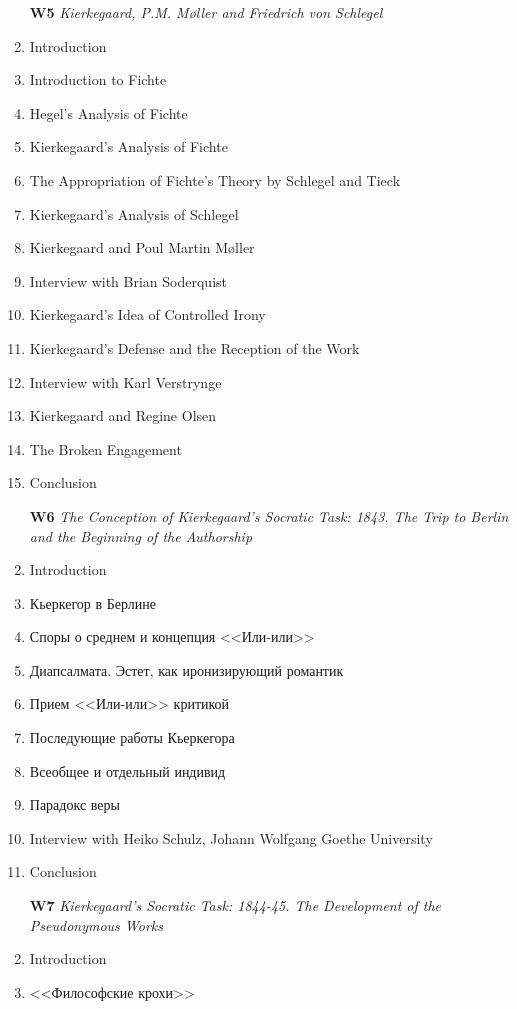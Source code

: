 \documentclass[a4paper]{article}
\begin{document}
\begin{multicols}{2}
\begin{enumerate}
\item[\bf W5] \textsl{Kierkegaard, P.M. Møller and Friedrich von Schlegel}
\item  Introduction
\item  Introduction to Fichte
\item  Hegel’s Analysis of Fichte
\item  Kierkegaard’s Analysis of Fichte
\item  The Appropriation of Fichte’s Theory by Schlegel and Tieck
\item  Kierkegaard’s Analysis of Schlegel
\item  Kierkegaard and Poul Martin Møller
\item  Interview with Brian Soderquist
\item  Kierkegaard’s Idea of Controlled Irony
\item  Kierkegaard’s Defense and the Reception of the Work
\item  Interview with Karl Verstrynge
\item  Kierkegaard and Regine Olsen
\item  The Broken Engagement
\item  Conclusion
\end{enumerate}

\begin{enumerate}
\item[\bf W6] \textsl{The Conception of Kierkegaard’s Socratic Task: 1843. The Trip to Berlin and the Beginning of the Authorship}
\item Introduction
\item Кьеркегор в Берлине
\item Споры о среднем и концепция <<Или-или>>
\item Диапсалмата. Эстет, как иронизирующий романтик
\item Прием <<Или-или>> критикой
\item Последующие работы Кьеркегора
\item Всеобщее и отдельный индивид
\item Парадокс веры
\item Interview with Heiko Schulz, Johann Wolfgang Goethe University
\item Conclusion
\end{enumerate}

\begin{enumerate}
\item[\bf W7] \textsl{Kierkegaard’s Socratic Task: 1844-45. The Development of the Pseudonymous Works}
\item Introduction
\item <<Философские крохи>>
\end{enumerate}
\end{multicols}
\newpage
\end{document}
